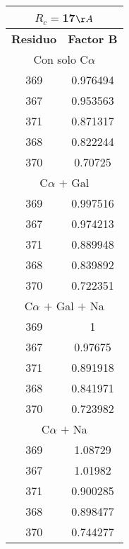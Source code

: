 \begin{tabular}[c]{|c|c|}
\multicolumn{2}{c}{$R_c=$17$\AA$}\\\hline
\textbf{Residuo}&\textbf{Factor B}\\\hline
\multicolumn{2}{c}{Con solo C$\alpha$}\\\hline
       369&  0.976494\\
       367&  0.953563\\
       371&  0.871317\\
       368&  0.822244\\
       370&   0.70725\\
\hline
\multicolumn{2}{c}{C$\alpha$ $+$ Gal}\\\hline
       369&  0.997516\\
       367&  0.974213\\
       371&  0.889948\\
       368&  0.839892\\
       370&  0.722351\\
\hline
\multicolumn{2}{c}{C$\alpha$ $+$ Gal $+$ Na}\\\hline
       369&         1\\
       367&   0.97675\\
       371&  0.891918\\
       368&  0.841971\\
       370&  0.723982\\
\hline
\multicolumn{2}{c}{C$\alpha$ $+$ Na}\\\hline
       369&   1.08729\\
       367&   1.01982\\
       371&  0.900285\\
       368&  0.898477\\
       370&  0.744277\\
\hline
\end{tabular}

